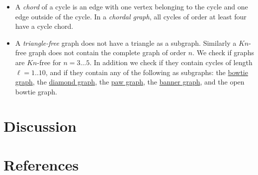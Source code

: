 \documentclass[12pt]{article}
\newcommand{\bowtiegraph}{\href{http://mathworld.wolfram.com/ButterflyGraph.html}{bowtie graph}}
\newcommand{\diamondgraph}{\href{http://mathworld.wolfram.com/DiamondGraph.html}{diamond graph}}
\newcommand{\pawgraph}{\href{http://mathworld.wolfram.com/PawGraph.html}{paw graph}}
\newcommand{\bannergraph}{\href{http://mathworld.wolfram.com/BannerGraph.html}{banner graph}}
\begin{document}
\begin{itemize}
\item A \textit{chord} of a cycle is an edge with one vertex belonging to the cycle and one edge outside of the cycle. In a \textit{chordal graph}, all cycles of order at least four have a cycle chord.   

\item A \textit{triangle-free} graph does not have a triangle as a subgraph. Similarly a $Kn$-free graph does not contain the complete graph of order $n$. We check if graphs are $Kn$-free for $n=3\dots 5$. In addition we check if they contain cycles of length $\ell = 1.. 10$, and if they contain any of the following as subgraphs: the \bowtiegraph, the \diamondgraph, the \pawgraph, the \bannergraph, and the open bowtie graph.  



\end{itemize}
\section{Discussion}


\section{References}
\end{document}
